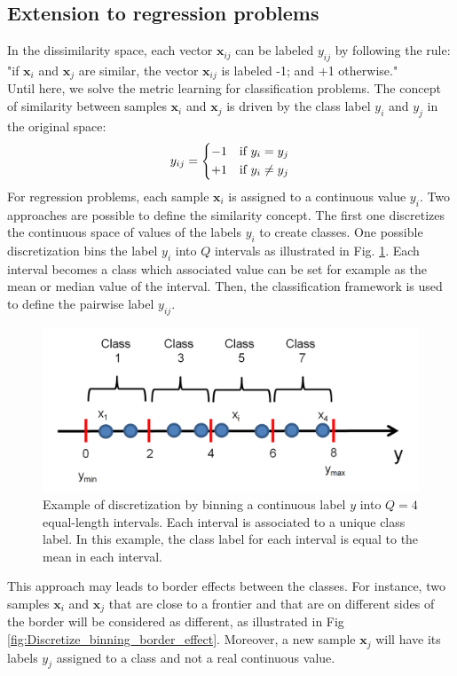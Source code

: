 \subsection{Extension to regression problems}
In the dissimilarity space, each vector $\textbf{x}_{ij}$ can be labeled $y_{ij}$ by following the rule: "if $\textbf{x}_i$ and $\textbf{x}_j$ are similar, the vector $\textbf{x}_{ij}$ is labeled -1; and +1 otherwise." \\
Until here, we solve the metric learning for classification problems. The concept of similarity between samples $\textbf{x}_i$ and $\textbf{x}_j$ is driven by the class label $y_i$ and $y_j$ in the original space:
\begin{equation}
y_{ij} = 
\left\{
\begin{split}
-1 \text{\quad if } y_i = y_j\\ 
+1 \text{\quad if } y_i \neq y_j
\end{split}
\right.
\end{equation}
For regression problems, each sample $\textbf{x}_i$ is assigned to a continuous value $y_i$. Two approaches are possible to define the similarity concept. The first one discretizes the continuous space of values of the labels $y_i$ to create classes. One possible discretization bins the label $y_i$ into $Q$ intervals as illustrated in Fig. \ref{fig:Discretize_binning}. Each interval becomes a class which associated value can be set for example as the mean or median value of the interval. Then, the classification framework is used to define the pairwise label $y_{ij}$.

\begin{figure}[h!]
	\centering
	\includegraphics[width=0.5\linewidth]{images/Discretize_binning}
	\caption{Example of discretization by binning a continuous label $y$ into $Q=4$ equal-length intervals. Each interval is associated to a unique class label. In this example, the class label for each interval is equal to the mean in each interval.}
	\label{fig:Discretize_binning}
\end{figure}

\noindent This approach may leads to border effects between the classes. For instance, two samples $\textbf{x}_i$ and $\textbf{x}_j$ that are close to a frontier and that are on different sides of the border will be considered as different, as illustrated in Fig \ref{fig:Discretize_binning_border_effect}. Moreover, a new sample $\textbf{x}_j$ will have its labels $y_j$ assigned to a class and not a real continuous value. 

